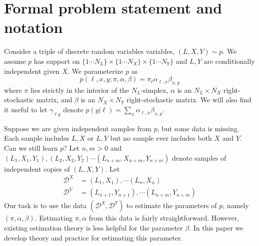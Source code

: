 \documentclass{article}
\theoremstyle{definition}
\begin{document}
\newcommand{\DX}{\mathcal{D}^X}
\newcommand{\DY}{\mathcal{D}^Y}
\newcommand{\DV}{\mathcal{D}}
\newcommand{\LL}{\mathcal{L}}
\newcommand{\pr}[1]{\mathrm{pr}\left(#1\right)}

                                        


\section{Formal problem statement and notation}

Consider a triple of discrete random variables variables, $(L,X,Y) \sim p$. We assume $p$ has support on $\{1\cdots N_L\}\times\{1\cdots N_X\}\times\{1\cdots N_Y\}$ and $L,Y$ are conditionally independent given $X$.  
We parameterize $p$ as
\[
p(\ell,x,y;\pi,\alpha,\beta)=\pi_\ell \alpha_{\ell,x} \beta_{x,y}
\]
where $\pi$ lies strictly in the interior of the $N_L$-simplex, $\alpha$ is an $N_L \times N_X$ right-stochastic matrix, and $\beta$ is an $N_X \times N_Y$ right-stochastic matrix.  We will also find it useful to let $\gamma_{\ell y}$ denote $p(y|\ell)=\sum_x \alpha_{\ell,x} \beta_{x,y}$. 

Suppose we are given independent samples from $p$, but some data is missing.  Each sample includes $L,X$ or $L,Y$ but no sample ever includes both $X$ and $Y$.  Can we still learn $p$?  Let $n,m>0$ and $(L_1,X_1,Y_1),(L_2,X_2,Y_2) \cdots (L_{n+m},X_{n+m},Y_{n+m})$ denote samples of independent copies of $(L,X,Y)$.  Let
%
\begin{align*}
\DX &= (L_1,X_1),\cdots (L_n,X_n) \\
\DY &= (L_{n+1},Y_{n+1}),\cdots (L_{n+m},Y_{n+m}) 
\end{align*}
%
Our task is to use the data $(\DX,\DY)$ to estimate the parameters of $p$, namely $(\pi,\alpha,\beta)$.  Estimating $\pi,\alpha$ from this data is fairly straightforward.  However, existing estimation theory is less helpful for the parameter $\beta$.  In this paper we develop theory and practice for estimating this parameter.

                                                   
\end{document}
